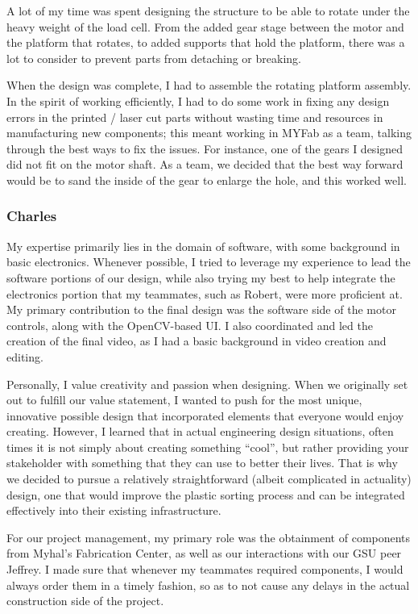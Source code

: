 \documentclass[12pt]{article}
\begin{document}
\begin{multicols*}{2}
                A lot of my time was spent designing the structure to be able to rotate under the heavy weight of the load cell. From the added gear stage between the motor and the platform that rotates, to added supports that hold the platform, there was a lot to consider to prevent parts from detaching or breaking.

                When the design was complete, I had to assemble the rotating platform assembly. In the spirit of working efficiently, I had to do some work in fixing any design errors in the printed / laser cut parts without wasting time and resources in manufacturing new components; this meant working in MYFab as a team, talking through the best ways to fix the issues. For instance, one of the gears I designed did not fit on the motor shaft. As a team, we decided that the best way forward would be to sand the inside of the gear to enlarge the hole, and this worked well.

            \subsubsection{Charles}
                My expertise primarily lies in the domain of software, with some background in basic electronics. Whenever possible, I tried to leverage my experience to lead the software portions of our design, while also trying my best to help integrate the electronics portion that my teammates, such as Robert, were more proficient at. My primary contribution to the final design was the software side of the motor controls, along with the OpenCV-based UI. I also coordinated and led the creation of the final video, as I had a basic background in video creation and editing. 
                
                Personally, I value creativity and passion when designing. When we originally set out to fulfill our value statement, I wanted to push for the most unique, innovative possible design that incorporated elements that everyone would enjoy creating. However, I learned that in actual engineering design situations, often times it is not simply about creating something “cool”, but rather providing your stakeholder with something that they can use to better their lives. That is why we decided to pursue a relatively straightforward (albeit complicated in actuality) design, one that would improve the plastic sorting process and can be integrated effectively into their existing infrastructure. 
                
                For our project management, my primary role was the obtainment of components from Myhal’s Fabrication Center, as well as our interactions with our GSU peer Jeffrey. I made sure that whenever my teammates required components, I would always order them in a timely fashion, so as to not cause any delays in the actual construction side of the project. 
        


\end{multicols*}
\end{document}
